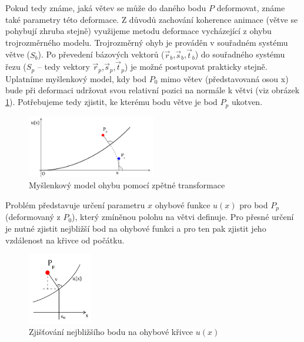 Pokud tedy známe, jaká větev se může do daného bodu $P$ deformovat, známe také parametry této deformace. Z důvodů zachování koherence animace (větve se pohybují zhruba stejně) využijeme metodu deformace vycházející z ohybu trojrozměrného modelu. Trojrozměrný ohyb je prováděn v souřadném systému větve ($S_b$). Po převedení bázových vektorů ($\vec{r}_b$,$\vec{s}_b$,$\vec{t}_b$) do souřadného systému řezu ($S_p$ – tedy vektory $\vec{r}_p$,$\vec{s}_p$,$\vec{t}_p$) je možné postupovat prakticky stejně. Uplatníme myšlenkový model, kdy bod $P_0$ mimo větev (představovaná osou x) bude při deformaci udržovat svou relativní pozici na normále k větvi (viz obrázek \ref{fig:bendModel}). Potřebujeme tedy zjistit, ke kterému bodu větve je bod $P_p$ ukotven.

\begin{figure}[!hbt]
\begin{center}
\includegraphics[width=0.5\textwidth]{./figures/revDef_ideal.png}
\caption{Myšlenkový model ohybu pomocí zpětné transformace\label{fig:bendModel}}
\end{center}
\end{figure}
 
Problém představuje určení parametru $x$ ohybové funkce $u(x)$ pro bod $P_p$ (deformovaný z $P_0$), který zmíněnou polohu na větvi definuje. Pro přesné určení je nutné zjistit nejbližší bod na ohybové funkci a pro ten pak zjistit jeho vzdálenost na křivce od počátku. 
\begin{figure}[!hbt]
\begin{center}
\includegraphics[width=0.25\textwidth]{./figures/revDef_dist.png}
\caption{Zjišťování nejbližšího bodu na ohybové křivce $u(x)$\label{fig:closestPointOnCurve}}
\end{center}
\end{figure}

